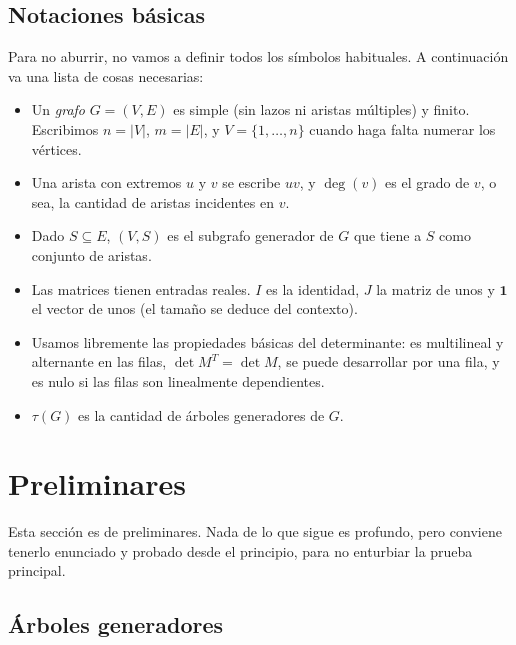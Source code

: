 \documentclass[12pt,a4paper]{article}
\theoremstyle{profesional}
\theoremstyle{definicion-style}
\theoremstyle{observacion-style}
\newcommand{\abs}[1]{\left| #1 \right|}
\begin{document}
\subsection{Notaciones básicas}

Para no aburrir, no vamos a definir todos los símbolos habituales. A continuación va una lista de cosas necesarias:

\begin{itemize}[leftmargin=2em]
    \item Un \emph{grafo} \( G = (V, E) \) es simple (sin lazos ni aristas múltiples) y finito. Escribimos \( n = \abs{V} \), \( m = \abs{E} \), y \( V = \{1, \ldots, n\} \) cuando haga falta numerar los vértices.
    \item Una arista con extremos \( u \) y \( v \) se escribe \( uv \), y \( \deg(v) \) es el grado de \( v \), o sea, la cantidad de aristas incidentes en \( v \).
    \item Dado \( S \subseteq E \), \( (V, S) \) es el subgrafo generador de \( G \) que tiene a \( S \) como conjunto de aristas.
    \item Las matrices tienen entradas reales. \( I \) es la identidad, \( J \) la matriz de unos y \( \mathbf{1} \) el vector de unos (el tamaño se deduce del contexto).
    \item Usamos libremente las propiedades básicas del determinante: es multilineal y alternante en las filas, \( \det M^{T} = \det M \), se puede desarrollar por una fila, y es nulo si las filas son linealmente dependientes.
    \item \( \tau(G) \) es la cantidad de árboles generadores de \( G \).
\end{itemize}

\newpage
\section{Preliminares}\label{sec:prelim}

Esta sección es de preliminares. Nada de lo que sigue es profundo, pero conviene tenerlo enunciado y probado desde el principio, para no enturbiar la prueba principal.

\subsection{Árboles generadores}
\end{document}
